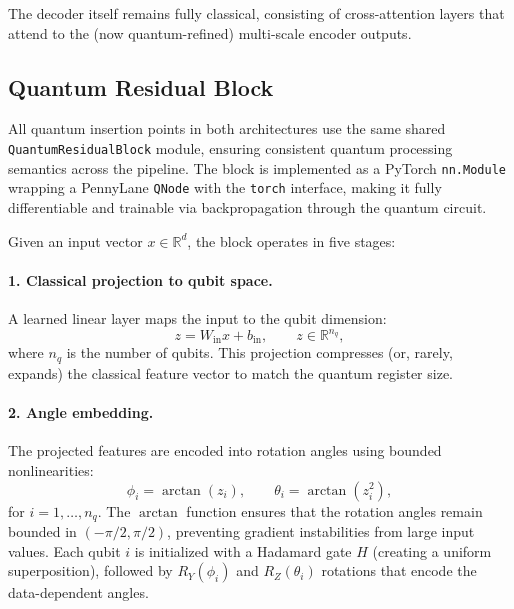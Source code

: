 \documentclass[11pt]{article}
\begin{document}
The decoder itself remains fully classical, consisting of cross-attention layers that attend to the (now quantum-refined) multi-scale encoder outputs.

\subsection{Quantum Residual Block}
\label{sec:qrb}

All quantum insertion points in both architectures use the same shared \texttt{QuantumResidualBlock} module, ensuring consistent quantum processing semantics across the pipeline. The block is implemented as a PyTorch \texttt{nn.Module} wrapping a PennyLane \texttt{QNode} with the \texttt{torch} interface, making it fully differentiable and trainable via backpropagation through the quantum circuit.

Given an input vector $x \in \mathbb{R}^{d}$, the block operates in five stages:

\paragraph{1. Classical projection to qubit space.}
A learned linear layer maps the input to the qubit dimension:
\[
z = W_{\text{in}}x + b_{\text{in}}, \qquad z \in \mathbb{R}^{n_q},
\]
where $n_q$ is the number of qubits. This projection compresses (or, rarely, expands) the classical feature vector to match the quantum register size.

\paragraph{2. Angle embedding.}
The projected features are encoded into rotation angles using bounded nonlinearities:
\[
\phi_i = \arctan(z_i), \qquad \theta_i = \arctan(z_i^2),
\]
for $i = 1, \ldots, n_q$. The $\arctan$ function ensures that the rotation angles remain bounded in $(-\pi/2, \pi/2)$, preventing gradient instabilities from large input values. Each qubit $i$ is initialized with a Hadamard gate $H$ (creating a uniform superposition), followed by $R_Y(\phi_i)$ and $R_Z(\theta_i)$ rotations that encode the data-dependent angles.
\end{document}
